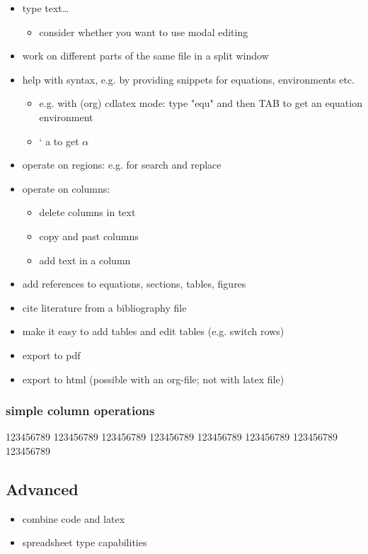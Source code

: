 \documentclass[11pt]{article}
\begin{document}
\begin{itemize}
\item type text\ldots{}
\begin{itemize}
\item consider whether you want to use modal editing
\end{itemize}
\item work on different parts of the same file in a split window
\item help with syntax, e.g. by providing snippets for equations, environments etc.
\begin{itemize}
\item e.g. with (org) cdlatex mode: type "equ" and then TAB to get an equation environment
\item ` a to get \(\alpha\)
\end{itemize}
\item operate on regions: e.g. for search and replace
\item operate on columns:
\begin{itemize}
\item delete columns in text
\item copy and past columns
\item add text in a column
\end{itemize}
\item add references to equations, sections, tables, figures
\item cite literature from a bibliography file
\item make it easy to add tables and edit tables (e.g. switch rows)
\item export to pdf
\item export to html (possible with an org-file; not with latex file)
\end{itemize}


\subsubsection{simple column operations}

123456789
123456789
123456789
123456789
123456789
123456789
123456789
123456789


\subsection{Advanced}

\begin{itemize}
\item combine code and latex
\item spreadsheet type capabilities
\end{itemize}
\end{document}
